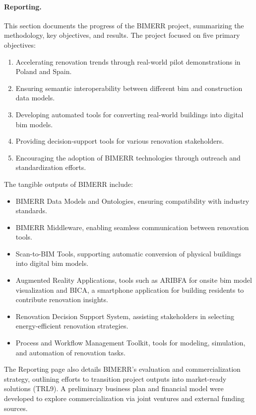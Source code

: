 \paragraph*{Reporting.}
This section documents the progress of the BIMERR project, summarizing the methodology, key objectives, and results.
The project focused on five primary objectives:
\begin{enumerate}
    \item Accelerating renovation trends through real-world pilot demonstrations in Poland and Spain.
    \item Ensuring semantic interoperability between different \gls{bim} and construction data models.
    \item Developing automated tools for converting real-world buildings into digital \gls{bim} models.
    \item Providing decision-support tools for various renovation stakeholders.
    \item Encouraging the adoption of BIMERR technologies through outreach and standardization efforts.
\end{enumerate}

The tangible outputs of BIMERR include:
\begin{itemize}
    \item BIMERR Data Models and Ontologies, ensuring compatibility with industry standards.
    \item BIMERR Middleware, enabling seamless communication between renovation tools.
    \item Scan-to-BIM Tools, supporting automatic conversion of physical buildings into digital \gls{bim} models.
    \item Augmented Reality Applications, tools such as ARIBFA for onsite \gls{bim} model visualization and BICA, a smartphone application for building residents to contribute renovation insights.
    \item Renovation Decision Support System, assisting stakeholders in selecting energy-efficient renovation strategies.
    \item Process and Workflow Management Toolkit, tools for modeling, simulation, and automation of renovation tasks.
\end{itemize}
	
The Reporting page also details BIMERR's evaluation and commercialization strategy, outlining efforts to transition project outputs into market-ready solutions (TRL9).
A preliminary business plan and financial model were developed to explore commercialization via joint ventures and external funding sources.

